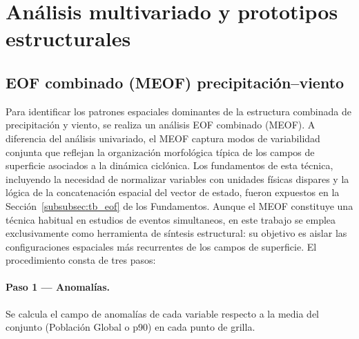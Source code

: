 
\section{Análisis multivariado y prototipos estructurales}\label{sec:meof_prototipos}

\subsection{EOF combinado (MEOF) precipitación--viento}\label{subsec:eof_multivariado}

Para identificar los patrones espaciales dominantes de la estructura combinada de precipitación y viento, se realiza un análisis EOF combinado (MEOF). A diferencia del análisis univariado, el MEOF captura modos de variabilidad conjunta que reflejan la organización morfológica típica de los campos de superficie asociados a la dinámica ciclónica. Los fundamentos de esta técnica, incluyendo la necesidad de normalizar variables con unidades físicas dispares y la lógica de la concatenación espacial del vector de estado, fueron expuestos en la Sección~\ref{subsubsec:tb_eof} de los Fundamentos. Aunque el MEOF constituye una técnica habitual en estudios de eventos simultaneos, en este trabajo se emplea exclusivamente como herramienta de síntesis estructural: su objetivo es aislar las configuraciones espaciales más recurrentes de los campos de superficie. El procedimiento consta de tres pasos:

\paragraph{Paso 1 — Anomalías.} Se calcula el campo de anomalías de cada variable respecto a la media del conjunto (Población Global o p90) en cada punto de grilla.


